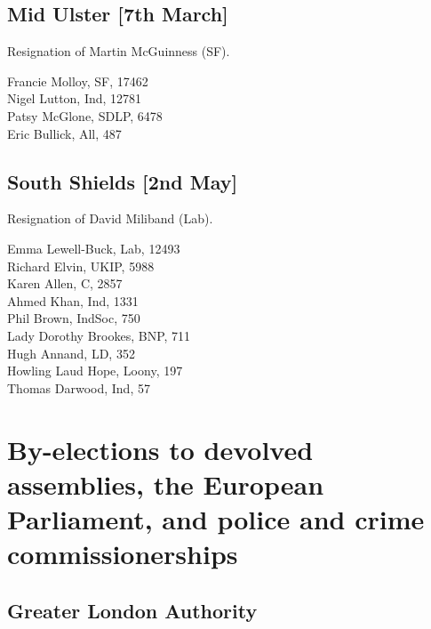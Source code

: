 \documentclass[a4paper,openany,10pt]{book}
\begin{document}
\vfill

\section*{Mid Ulster\hspace*{\fill}\nolinebreak[1]%
\enspace\hspace*{\fill}
[7th March]}


Resignation of Martin McGuinness (SF).



Francie Molloy, SF, 17462\\
Nigel Lutton, Ind, 12781\\
Patsy McGlone, SDLP, 6478\\
Eric Bullick, All, 487\\


\section*{South Shields\hspace*{\fill}\nolinebreak[1]%
\enspace\hspace*{\fill}
[2nd May]}


Resignation of David Miliband (Lab).



Emma Lewell-Buck, Lab, 12493\\
Richard Elvin, UKIP, 5988\\
Karen Allen, C, 2857\\
Ahmed Khan, Ind, 1331\\
Phil Brown, IndSoc, 750\\
Lady Dorothy Brookes, BNP, 711\\
Hugh Annand, LD, 352\\
Howling Laud Hope, Loony, 197\\
Thomas Darwood, Ind, 57\\


\chapter{By-elections to devolved assemblies, the European Parliament, and police and crime commissionerships}

\section{Greater London Authority}
\end{document}
